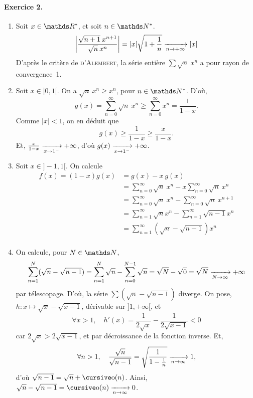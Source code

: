 \documentclass[a4paper]{article}
\begin{document}
	\paragraph{Exercice 2.}
	\begin{enumerate}[start=0]
		\item Soit $x \in \R^*$, et soit $n \in \N^*$.
			\begin{align*}
				\left| \frac{\sqrt{n+1}\:x^{n+1}}{\sqrt{n}\:x^n} \right| = |x| \sqrt{1 + \frac{1}{n}}  \xrightarrow[n\to +\infty]{} |x|
			\end{align*}
			D'après le critère de \textsc{d'Alembert}, la série entière $\sum \sqrt{n}\:x^n$\/ a pour rayon de convergence~1.
		\item Soit $x \in {]0,1[}$. On a $\sqrt{n}\:x^n \ge x^n$, pour $n \in \N^*$. D'où, \[
				g(x) = \sum_{n=0}^\infty \sqrt{n}\:x^n \ge \sum_{n=0}^\infty x^n = \frac{1}{1-x}
			.\] Comme $|x| < 1$, on en déduit que \[
				g(x) \ge \frac{1}{1-x} \ge \frac{x}{1-x}
			.\]
			Et, $\frac{x}{1-x} \xrightarrow[x\to 1^-]{} +\infty$, d'où $g(x) \xrightarrow[x\to 1^-]{} +\infty$.
		\item Soit $x \in {]-1,1[}$. On calcule
			\begin{align*}
				f(x) = (1-x) g(x) &= g(x) - x\:g(x) \\
				&= \sum_{n=0}^\infty \sqrt{n}\:x^n - x\sum_{n=0}^\infty \sqrt{n}\:x^n \\
				&= \sum_{n=0}^\infty \sqrt{n}\:x^n - \sum_{n=0}^\infty \sqrt{n}\:x^{n+1} \\
				&= \sum_{n=1}^\infty \sqrt{n} x^n - \sum_{n=1}^\infty \sqrt{n - 1} x^n \\
				&= \sum_{n=1}^\infty (\sqrt{n} - \sqrt{n-1})x^n \\
			\end{align*}
		\item On calcule, pour $N \in \N$,
			\[
				\sum_{n=1}^N (\sqrt{n} - \sqrt{n-1}) = \sum_{n=1}^N \sqrt{n} - \sum_{n=0}^{N-1} \sqrt{n} = \sqrt{N} - \sqrt{0} = \sqrt{N} \xrightarrow[N\to \infty]{} +\infty
			\] 
			par télescopage. D'où, la série $\sum(\sqrt{n} -\sqrt{n-1})$\/ diverge.
			On pose, $h : x \mapsto \sqrt{x} - \sqrt{x-1}$, dérivable sur $]1, +\infty[$, et \[
				\forall x > 1,\quad h'(x) = \frac{1}{2\sqrt{x}} - \frac{1}{2\sqrt{x-1}} < 0
			\] car $2\sqrt{x} > 2 \sqrt{x-1}$, et par décroissance de la fonction inverse.
			Et, \[
				\forall n > 1,\quad\frac{\sqrt{n}}{\sqrt{n-1}} = \sqrt{\frac{1}{1-\frac{1}{n}}} \xrightarrow[n\to \infty]{} 1,
			\] d'où $\sqrt{n-1} = \sqrt{n} + \po(n)$. Ainsi, $\sqrt{n} - \sqrt{n-1} = \po(n) \tendsto{n\to \infty} 0$.

\end{enumerate}
\end{document}
